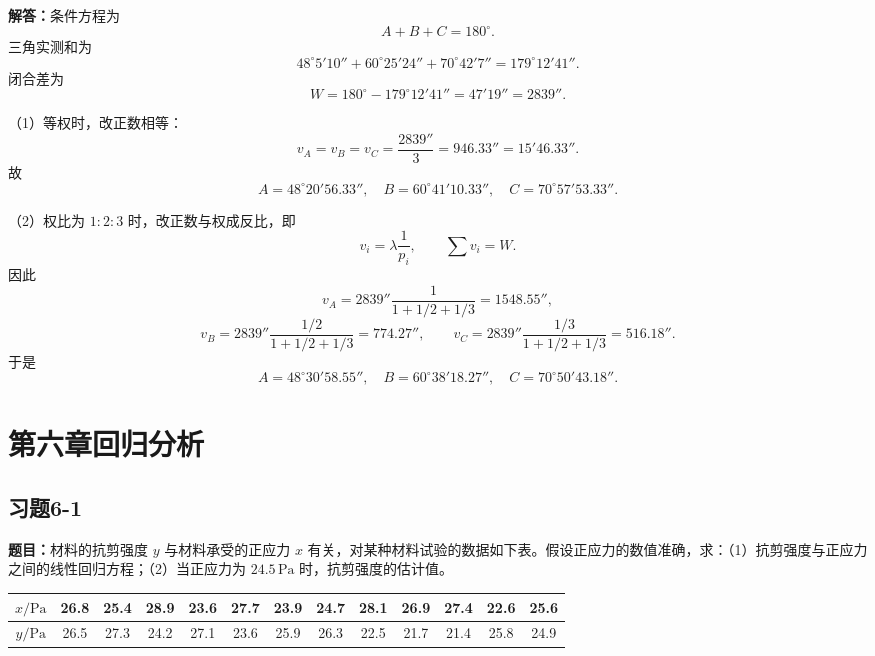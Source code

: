 \documentclass[UTF8,zihao=-4]{ctexart}
\newcommand{\problem}[1]{\subsection*{#1}}
\newcommand{\timu}{\noindent\textbf{题目：}}
\newcommand{\jieda}{\noindent\textbf{解答：}}
\begin{document}
{\jieda 条件方程为
\begin{equation*}
    A+B+C=180^\circ.
\end{equation*}
三角实测和为
\begin{equation*}
    48^\circ5'10''+60^\circ25'24''+70^\circ42'7''=179^\circ12'41''.
\end{equation*}
闭合差为
\begin{equation*}
    W=180^\circ-179^\circ12'41''=47'19''=2839''.
\end{equation*}

（1）等权时，改正数相等：
\begin{equation*}
    v_A=v_B=v_C=\frac{2839''}{3}=946.33''=15'46.33''.
\end{equation*}
故
\begin{equation*}
    A=48^\circ20'56.33'',\quad
    B=60^\circ41'10.33'',\quad
    C=70^\circ57'53.33''.
\end{equation*}

（2）权比为 $1:2:3$ 时，改正数与权成反比，即
\begin{equation*}
    v_i=\lambda\frac{1}{p_i},
    \qquad
    \sum v_i=W.
\end{equation*}
因此
\begin{equation*}
    v_A=2839''\frac{1}{1+1/2+1/3}=1548.55'',
\end{equation*}
\begin{equation*}
    v_B=2839''\frac{1/2}{1+1/2+1/3}=774.27'',
    \qquad
    v_C=2839''\frac{1/3}{1+1/2+1/3}=516.18''.
\end{equation*}
于是
\begin{equation*}
    A=48^\circ30'58.55'',\quad
    B=60^\circ38'18.27'',\quad
    C=70^\circ50'43.18''.
\end{equation*}

\newpage

\section*{第六章\quad 回归分析}

\problem{习题6-1}
\timu 材料的抗剪强度 $y$ 与材料承受的正应力 $x$ 有关，对某种材料试验的数据如下表。假设正应力的数值准确，求：（1）抗剪强度与正应力之间的线性回归方程；（2）当正应力为 $24.5\,\mathrm{Pa}$ 时，抗剪强度的估计值。

\begin{center}
\scriptsize
\setlength{\tabcolsep}{4pt}
\begin{tabular}{c|cccccccccccc}
\toprule
$x/\mathrm{Pa}$ & 26.8 & 25.4 & 28.9 & 23.6 & 27.7 & 23.9 & 24.7 & 28.1 & 26.9 & 27.4 & 22.6 & 25.6\\
\midrule
$y/\mathrm{Pa}$ & 26.5 & 27.3 & 24.2 & 27.1 & 23.6 & 25.9 & 26.3 & 22.5 & 21.7 & 21.4 & 25.8 & 24.9\\
\bottomrule
\end{tabular}
\end{center}

}
\end{document}
